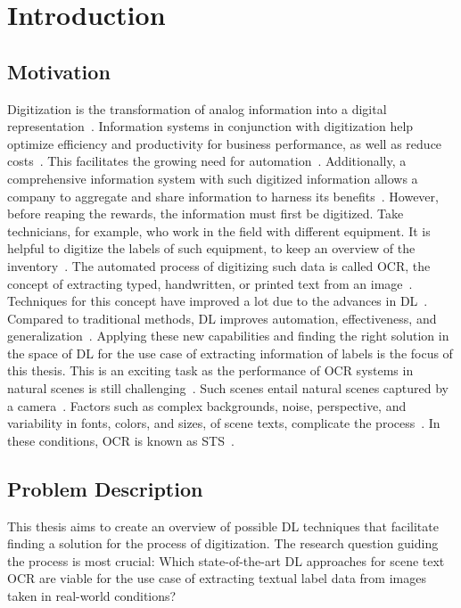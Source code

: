 \chapter{Introduction}\label{ch:intro}
\section{Motivation}
Digitization is the transformation of analog information into a digital
representation~\citep{imgrund_approaching_2018}.
Information systems in conjunction with digitization help optimize efficiency and productivity
for business performance, as well as reduce costs~\citep{imgrund_approaching_2018}.
This facilitates the growing need for automation~\citep{imgrund_approaching_2018}.
Additionally, a comprehensive information system with such digitized information allows a company
to aggregate and share information to harness its benefits~\citep{goodhue_impact_1992}.
However, before reaping the rewards, the information must first be digitized.
Take technicians, for example, who work in the field with different equipment.
It is helpful to digitize the labels of such equipment, to keep an overview of the
inventory~\citep{abramowicz_business_2019}.
The automated process of digitizing such data is called \ac{OCR}, the concept of extracting typed,
handwritten, or printed text from an image~\citep{zhao_improving_2020}.
Techniques for this concept have improved a lot due to the advances in
\ac{DL}~\citep{zhao_improving_2020}.
Compared to traditional methods, \ac{DL} improves automation, effectiveness, and
generalization~\citep{chen_text_2021}.
Applying these new capabilities and finding the right solution in the space of \ac{DL} for the
use case of extracting information of labels is the focus of this thesis.
This is an exciting task as the performance of \ac{OCR} systems in natural scenes is still
challenging~\citep{zhao_improving_2020, chen_text_2021}.
Such scenes entail natural scenes captured by a camera~\citep{chen_text_2021, baek_what_2019}.
Factors such as complex backgrounds, noise, perspective, and variability in fonts, colors, and sizes,
of scene texts, complicate the process~\citep{hu_gtc_2020,chen_text_2021,baek_what_2019}.
In these conditions, \ac{OCR} is known as \ac{STS}~\citep{long_scene_2021}.

\section{Problem Description}\label{se:problem}
This thesis aims to create an overview of possible \ac{DL} techniques that facilitate
finding a solution for the process of digitization.
The research question guiding the process is most crucial:
Which state-of-the-art \ac{DL} approaches for scene text \ac{OCR} are viable for the use case of
extracting textual label data from images taken in real-world conditions?

